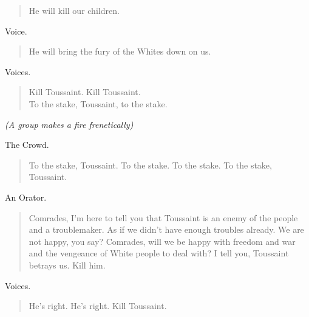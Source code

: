 \documentclass[letterpaper,article,12pt,oneside,notitlepage]{memoir}
\begin{document}
\begin{verse}
He will kill our children. \\
\end{verse}

\begin{center}Voice.\end{center}

\begin{verse}
He will bring the fury of the Whites down on us. \\
\end{verse}

\begin{center}Voices.\end{center}

\begin{verse}
Kill Toussaint. Kill Toussaint. \\
To the stake, Toussaint, to the stake. \\
\end{verse}

 \textit{(A group makes a fire frenetically)}

\begin{center}The Crowd.\end{center}

\begin{verse}
To the stake, Toussaint. To the stake. To the stake. To the stake, Toussaint. \\
\end{verse}

\begin{center}An Orator.\end{center}

\begin{verse}
\indent Comrades, I'm here to tell you that Toussaint is an enemy of the people and a troublemaker. As if we didn't have enough troubles already. We are not happy, you say? Comrades, will we be happy with freedom and war and the vengeance of White people to deal with? I tell you, Toussaint betrays us. Kill him. \\
\end{verse}

\begin{center}Voices.\end{center}

\begin{verse}
\hspace{1cm} He's right. He's right. Kill Toussaint. \\
\end{verse}
\end{document}

